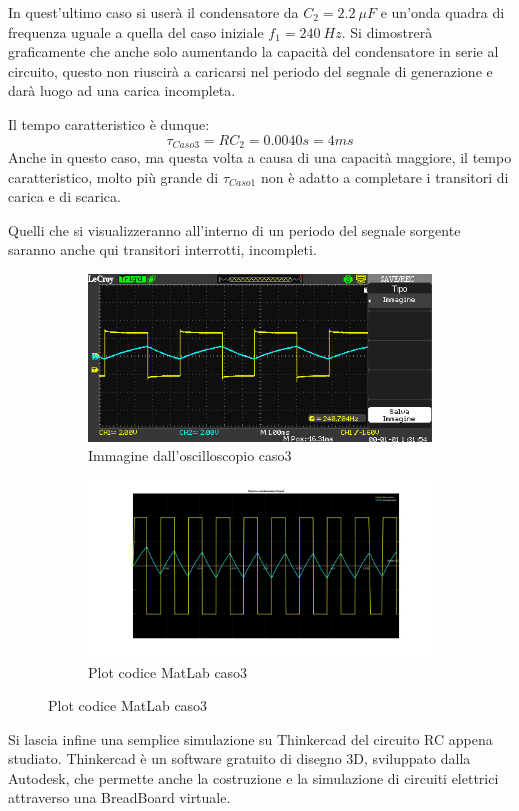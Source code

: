 \documentclass[a4paper, 12pt, twoside]{report}
\begin{document}
{ In quest'ultimo caso si userà il condensatore da $C_{2}=2.2 ~\mu F$ e un'onda quadra di frequenza uguale a quella del caso iniziale $f_{1}=240 ~Hz$.
 Si dimostrerà graficamente che anche solo aumentando la capacità del condensatore in serie al circuito, questo non riuscirà a caricarsi nel periodo del segnale di generazione e darà luogo ad una carica incompleta.

Il tempo caratteristico è dunque:
\[
\tau_{Caso3}=RC_{2}=0.0040s=4ms
\]
Anche in questo caso, ma questa volta a causa di una capacità maggiore, il tempo caratteristico, molto più grande di $\tau_{Caso1}$ non è adatto a completare i transitori di carica e di scarica.

Quelli che si visualizzeranno all'interno di un periodo del segnale sorgente saranno anche qui transitori interrotti, incompleti. 

\begin{figure}[H]
	\begin{subfigure}{1\textwidth}
		\centering
		\includegraphics[width=1\linewidth]{Esperienza/ImmaginiOscilloscopio/Caso3}  
		\caption{Immagine dall'oscilloscopio caso3}
		\label{fig:sub5}
	\end{subfigure}
	\begin{subfigure}{1\textwidth}
		\centering
		\includegraphics[width=1\linewidth]{Esperienza/MLcaso3}
		\caption{Plot codice MatLab caso3}
		\label{fig:sub6}
	\end{subfigure}
\end{figure}
\begin{tiny}
Si lascia infine una semplice simulazione su Thinkercad del circuito RC appena studiato. \newline
Thinkercad è un software gratuito di disegno 3D, sviluppato dalla Autodesk, che permette anche la costruzione e la simulazione di circuiti elettrici attraverso una BreadBoard virtuale. \newline


\end{tiny}}
\end{document}
